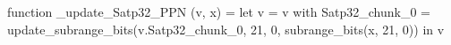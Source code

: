 function _update_Satp32_PPN (v, x) = let v = { v with Satp32_chunk_0 = update_subrange_bits(v.Satp32_chunk_0, 21, 0, subrange_bits(x, 21, 0)) } in
  v
